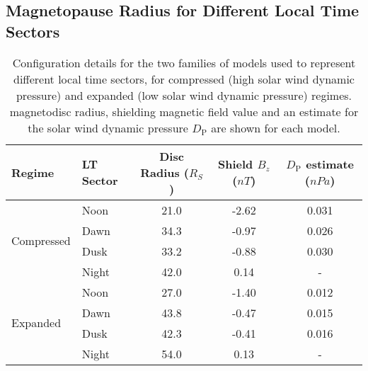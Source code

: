 \subsection{Magnetopause Radius for Different Local Time Sectors}
\begin{table}
\caption[Details of the magnetodisc radius, shielding magnetic field value and $D_\mathrm{P}$ estimate for each local time sector model.]{Configuration details for the two families of models used to represent different local time sectors, for compressed (high solar wind dynamic pressure) and expanded (low solar wind dynamic pressure) regimes. magnetodisc radius, shielding magnetic field value and an estimate for the solar wind dynamic pressure $D_\mathrm{P}$ are shown for each model.}\label{LTsectors:tab:modelparams}
\centering
\begin{tabular}{l l c c c}
\hline
Regime									&	LT Sector		& \makecell{Disc Radius \\ ($\si{R_S}$)}		& \makecell{Shield $B_z$ \\ ($\si{nT}$)}		& \makecell{$D_\mathrm{P}$ estimate \\ ($\si{nPa}$)}\\
\hline
\multirow{4}{*}{Compressed} & Noon			&	21.0										& -2.62									& 0.031 \\
												& Dawn			& 34.3										& -0.97									& 0.026 \\
												&	Dusk			&	33.2										&	-0.88									& 0.030 \\
												& Night			& 42.0										& 0.14										&	- \\
\hline
\multirow{4}{*}{Expanded}  	& Noon			& 27.0										& -1.40									& 0.012 \\
												& Dawn			& 43.8										& -0.47									&	0.015 \\
												& Dusk				& 42.3										& -0.41									& 0.016 \\
												& Night			& 54.0										& 0.13										& - \\
\hline
\end{tabular}
\end{table}

